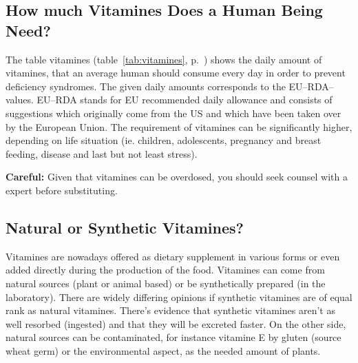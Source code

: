 \documentclass[../main.tex]{subfiles}
\begin{document}
    \subsection{How much Vitamines Does a Human Being Need?}

    The table vitamines (table~\ref{tab:vitamines}, p.~\pageref{tab:vitamines}) shows the daily amount of vitamines,
    that an average human should consume every day in order to prevent deficiency syndromes.
    The given daily amounts corresponds to the EU--RDA--values.
    EU--RDA stands for EU recommended daily allowance and consists of suggestions which originally come from the US and which
    have been taken over by the European Union.
    The requirement of vitamines can be significantly higher, depending on life situation
    (ie. children, adolescents, pregnancy and breast feeding, disease and last but not least stress).

    \textbf{Careful:} Given that vitamines can be overdosed, you should seek counsel with a expert before substituting.

    \subsection{Natural or Synthetic Vitamines?}
    Vitamines are nowadays offered as dietary supplement in various forms or even added directly during the production of the food.
    Vitamines can come from natural sources (plant or animal based) or be synthetically prepared (in the laboratory).
    There are widely differing opinions if synthetic vitamines are of equal rank as natural vitamines.
    There's evidence that synthetic vitamines aren't as well resorbed (ingested) and that they will be excreted faster.
    On the other side, natural sources can be contaminated, for instance vitamine E by gluten (source wheat germ)
    or the environmental aspect, as the needed amount of plants.
\end{document}

